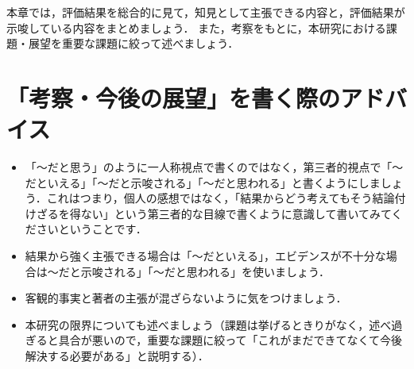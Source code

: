 本章では，評価結果を総合的に見て，知見として主張できる内容と，評価結果が示唆している内容をまとめましょう．
また，考察をもとに，本研究における課題・展望を重要な課題に絞って述べましょう．

\section{「考察・今後の展望」を書く際のアドバイス\cite{shinagawa}}
\begin{itemize}
    \item 「～だと思う」のように一人称視点で書くのではなく，第三者的視点で「～だといえる」「～だと示唆される」「～だと思われる」と書くようにしましょう．これはつまり，個人の感想ではなく，「結果からどう考えてもそう結論付けざるを得ない」という第三者的な目線で書くように意識して書いてみてくださいということです．
    \item 結果から強く主張できる場合は「～だといえる」，エビデンスが不十分な場合は～だと示唆される」「～だと思われる」を使いましょう．
    \item 客観的事実と著者の主張が混ざらないように気をつけましょう．
    \item 本研究の限界についても述べましょう（課題は挙げるときりがなく，述べ過ぎると具合が悪いので，重要な課題に絞って「これがまだできてなくて今後解決する必要がある」と説明する）．
\end{itemize}